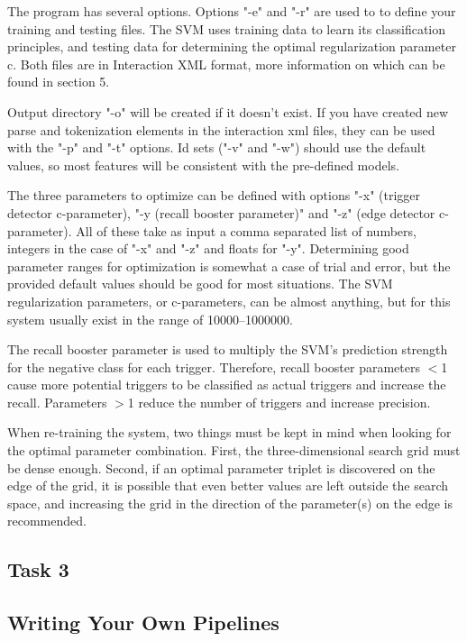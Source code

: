 \documentclass[a4paper,12pt]{article}
\begin{document}
The program has several options. Options "-e" and "-r" are used to to define your
training and testing files. The SVM uses training data to learn its
classification principles, and testing data for determining the optimal
regularization parameter c. Both files are in Interaction XML format, more
information on which can be found in section 5.

Output directory "-o" will be created if it doesn't exist. If you have created
new parse and tokenization elements in the interaction xml files, they can be
used with the "-p" and "-t" options. Id sets ("-v" and "-w") should use the
default values, so most features will be consistent with the pre-defined models.

The three parameters to optimize can be defined with options "-x" (trigger
detector c-parameter), "-y (recall booster parameter)" and "-z" (edge detector
c-parameter). All of these take as input a comma separated list of numbers,
integers in the case of "-x" and "-z" and floats for "-y". Determining good
parameter ranges for optimization is somewhat a case of trial and error, but the
provided default values should be good for most situations. The SVM
regularization parameters, or c-parameters, can be almost anything, but for this
system usually exist in the range of 10000--1000000.

The recall booster parameter is used to multiply the SVM's prediction strength
for the negative class for each trigger. Therefore, recall booster parameters
$<$1 cause more potential triggers to be classified as actual triggers and increase
the recall. Parameters $>$1 reduce the number of triggers and increase
precision.

When re-training the system, two things must be kept in mind when looking for the
optimal parameter combination. First, the three-dimensional search grid must be
dense enough. Second, if an optimal parameter triplet is discovered on the edge
of the grid, it is possible that even better values are left outside the search
space, and increasing the grid in the direction of the parameter(s) on the edge
is recommended.

\subsection{Task 3}

\subsection{Writing Your Own Pipelines}
\end{document}
